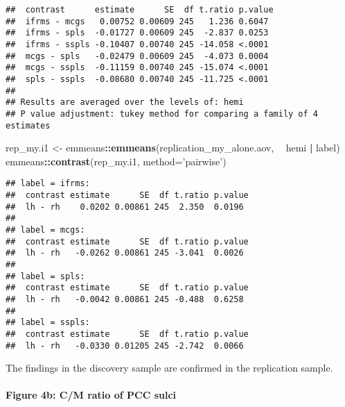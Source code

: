 \documentclass[
]{article}
\newenvironment{Shaded}{\begin{snugshade}}{\end{snugshade}}
\newcommand{\DataTypeTok}[1]{\textcolor[rgb]{0.13,0.29,0.53}{#1}}
\newcommand{\KeywordTok}[1]{\textcolor[rgb]{0.13,0.29,0.53}{\textbf{#1}}}
\newcommand{\NormalTok}[1]{#1}
\newcommand{\OperatorTok}[1]{\textcolor[rgb]{0.81,0.36,0.00}{\textbf{#1}}}
\newcommand{\StringTok}[1]{\textcolor[rgb]{0.31,0.60,0.02}{#1}}
\begin{document}
\begin{verbatim}
##  contrast      estimate      SE  df t.ratio p.value
##  ifrms - mcgs   0.00752 0.00609 245   1.236 0.6047 
##  ifrms - spls  -0.01727 0.00609 245  -2.837 0.0253 
##  ifrms - sspls -0.10407 0.00740 245 -14.058 <.0001 
##  mcgs - spls   -0.02479 0.00609 245  -4.073 0.0004 
##  mcgs - sspls  -0.11159 0.00740 245 -15.074 <.0001 
##  spls - sspls  -0.08680 0.00740 245 -11.725 <.0001 
## 
## Results are averaged over the levels of: hemi 
## P value adjustment: tukey method for comparing a family of 4 estimates
\end{verbatim}

\begin{Shaded}
\begin{Highlighting}[]
\NormalTok{rep_my.i1 <-}\StringTok{ }\NormalTok{emmeans}\OperatorTok{::}\KeywordTok{emmeans}\NormalTok{(replication_my_alone.aov, }\OperatorTok{~}\StringTok{ }\NormalTok{hemi }\OperatorTok{|}\StringTok{ }\NormalTok{label)}
\NormalTok{emmeans}\OperatorTok{::}\KeywordTok{contrast}\NormalTok{(rep_my.i1, }\DataTypeTok{method=}\StringTok{'pairwise'}\NormalTok{)}
\end{Highlighting}
\end{Shaded}

\begin{verbatim}
## label = ifrms:
##  contrast estimate      SE  df t.ratio p.value
##  lh - rh    0.0202 0.00861 245  2.350  0.0196 
## 
## label = mcgs:
##  contrast estimate      SE  df t.ratio p.value
##  lh - rh   -0.0262 0.00861 245 -3.041  0.0026 
## 
## label = spls:
##  contrast estimate      SE  df t.ratio p.value
##  lh - rh   -0.0042 0.00861 245 -0.488  0.6258 
## 
## label = sspls:
##  contrast estimate      SE  df t.ratio p.value
##  lh - rh   -0.0330 0.01205 245 -2.742  0.0066
\end{verbatim}

The findings in the discovery sample are confirmed in the replication
sample.

\hypertarget{figure-4b-cm-ratio-of-pcc-sulci}{%
\paragraph{Figure 4b: C/M ratio of PCC
sulci}\label{figure-4b-cm-ratio-of-pcc-sulci}}
\end{document}
